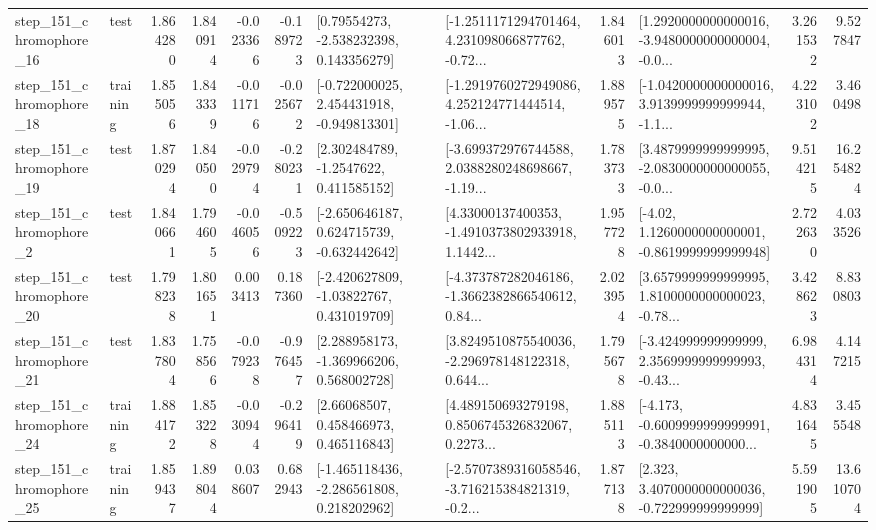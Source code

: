 \begin{tabular}{llrrrrllrlrr}
  step\_151\_chromophore\_16 &      test &      1.864280 &    1.840914 &     -0.023366 & -0.189723 &     [0.79554273, -2.538232398, 0.143356279] &  [-1.2511171294701464, 4.231098066877762, -0.72... &       1.846013 &  [1.2920000000000016, -3.9480000000000004, -0.0... &            3.261532 &          9.527847 \\
  step\_151\_chromophore\_18 &  training &      1.855056 &    1.843339 &     -0.011716 & -0.025672 &   [-0.722000025, 2.454431918, -0.949813301] &  [-1.2919760272949086, 4.252124771444514, -1.06... &       1.889575 &  [-1.0420000000000016, 3.9139999999999944, -1.1... &            4.223102 &          3.460498 \\
  step\_151\_chromophore\_19 &      test &      1.870294 &    1.840500 &     -0.029794 & -0.280231 &      [2.302484789, -1.2547622, 0.411585152] &  [-3.699372976744588, 2.0388280248698667, -1.19... &       1.783733 &  [3.4879999999999995, -2.0830000000000055, -0.0... &            9.514215 &         16.254824 \\
   step\_151\_chromophore\_2 &      test &      1.840661 &    1.794605 &     -0.046056 & -0.509223 &   [-2.650646187, 0.624715739, -0.632442642] &  [4.33000137400353, -1.4910373802933918, 1.1442... &       1.957728 &   [-4.02, 1.1260000000000001, -0.8619999999999948] &            2.722630 &          4.033526 \\
  step\_151\_chromophore\_20 &      test &      1.798238 &    1.801651 &      0.003413 &  0.187360 &    [-2.420627809, -1.03822767, 0.431019709] &  [-4.373787282046186, -1.3662382866540612, 0.84... &       2.023954 &  [3.6579999999999995, 1.8100000000000023, -0.78... &            3.428623 &          8.830803 \\
  step\_151\_chromophore\_21 &      test &      1.837804 &    1.758566 &     -0.079238 & -0.976457 &    [2.288958173, -1.369966206, 0.568002728] &  [3.8249510875540036, -2.296978148122318, 0.644... &       1.795678 &  [-3.424999999999999, 2.3569999999999993, -0.43... &            6.984314 &          4.147215 \\
  step\_151\_chromophore\_24 &  training &      1.884172 &    1.853228 &     -0.030944 & -0.296419 &      [2.66068507, 0.458466973, 0.465116843] &  [4.489150693279198, 0.8506745326832067, 0.2273... &       1.885113 &  [-4.173, -0.6009999999999991, -0.3840000000000... &            4.831645 &          3.455548 \\
  step\_151\_chromophore\_25 &  training &      1.859437 &    1.898044 &      0.038607 &  0.682943 &   [-1.465118436, -2.286561808, 0.218202962] &  [-2.5707389316058546, -3.716215384821319, -0.2... &       1.877138 &    [2.323, 3.4070000000000036, -0.722999999999999] &            5.591905 &         13.610704 \\

\end{tabular}
